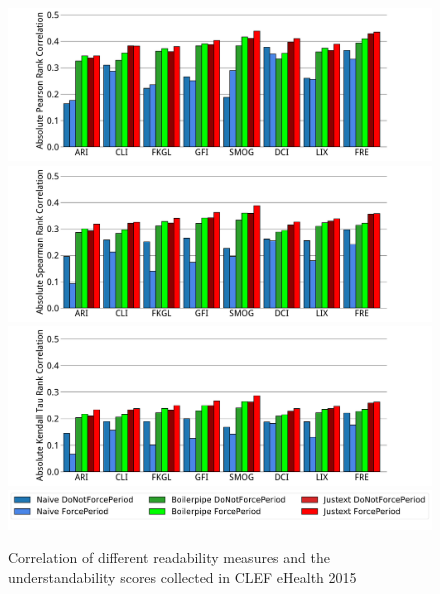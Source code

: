 \begin{figure}[th!]
   \centering
   \includegraphics[width=1.\textwidth]{graphics/bar_corr_pearson15_values}
   \includegraphics[width=1.00\textwidth]{graphics/bar_corr_spearman15_values}
   \includegraphics[width=1.00\textwidth]{graphics/bar_corr_kendalltau15_values}
   \includegraphics[width=1\textwidth]{graphics/legend62}
    \caption{Correlation of different readability measures and the understandability scores collected in CLEF eHealth 2015}
   \label{fig:bar_corr_clef15}
\end{figure}

